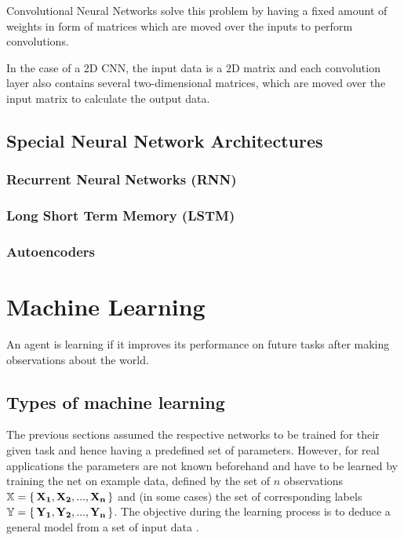 		Convolutional Neural Networks solve this problem by having a fixed amount of weights in form of matrices which are moved over the inputs to perform convolutions.  
		
		
		
		
		
		In the case of a 2D CNN, the input data is a 2D matrix and each convolution layer also contains several two-dimensional matrices, which are moved over the input matrix to calculate the output data. 
		
		
	
	\subsection{Special Neural Network Architectures}
	
	\subsubsection { Recurrent Neural Networks (RNN) }
	
	\subsubsection { Long Short Term Memory (LSTM) }
	
	\subsubsection{Autoencoders}
	
	
	
		
\section { Machine Learning }
	\begin{displayquote}
		An agent is learning if it improves its performance on future tasks after making observations about the world.
	\end{displayquote}
	
	
	\subsection { Types of machine learning }

		The previous sections assumed the respective networks to be trained for their given task and hence having a predefined set of parameters. However, for real applications the parameters are not known beforehand and have to be learned by training the net on example data, defined by the set of $n$ observations $\mathbb{X} = \set{\mathbf{X_1},\mathbf{ X_2}, ..., \mathbf{X_n}}$ and (in some cases) the set of corresponding labels $\mathbb{Y} = \set{\mathbf{Y_1},\mathbf{Y_2}, ..., \mathbf{Y_n}}$. The objective during the learning process is to deduce a general model from a set of input data \cite{Bishop2009}. 
	

